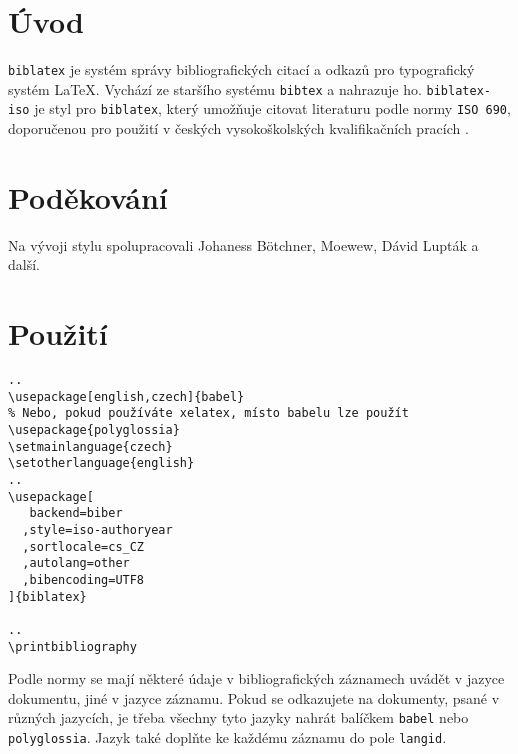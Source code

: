 \documentclass[a4paper,10pt]{ltxdockit}
\def\t|#1|{\texttt{#1}}
\begin{document}
\printtitlepage
\tableofcontents
\section{Úvod}
\t|biblatex| je systém správy bibliografických citací a odkazů pro typografický
systém \LaTeX. Vychází ze staršího systému \t|bibtex| a nahrazuje ho.
\t|biblatex-iso| je styl pro \t|biblatex|, který umožňuje citovat literaturu
podle normy \t|ISO 690|, doporučenou pro použití v českých vysokoškolských
kvalifikačních pracích \parencite{t00}.

\section{Poděkování}

Na vývoji stylu spolupracovali Johaness Bötchner, Moewew, Dávid Lupták a další.

\section{Použití}
\begin{verbatim}
..
\usepackage[english,czech]{babel}
% Nebo, pokud používáte xelatex, místo babelu lze použít 
\usepackage{polyglossia}
\setmainlanguage{czech}
\setotherlanguage{english}
..
\usepackage[
   backend=biber
  ,style=iso-authoryear
  ,sortlocale=cs_CZ
  ,autolang=other
  ,bibencoding=UTF8
]{biblatex}

..
\printbibliography

\end{verbatim}

Podle normy se mají některé údaje v bibliografických záznamech uvádět v jazyce dokumentu, jiné v jazyce záznamu. Pokud se odkazujete na dokumenty, psané v různých jazycích, je třeba všechny tyto jazyky nahrát balíčkem \t|babel| nebo \t|polyglossia|. Jazyk také doplňte ke každému záznamu do pole \t|langid|.

\end{document}
